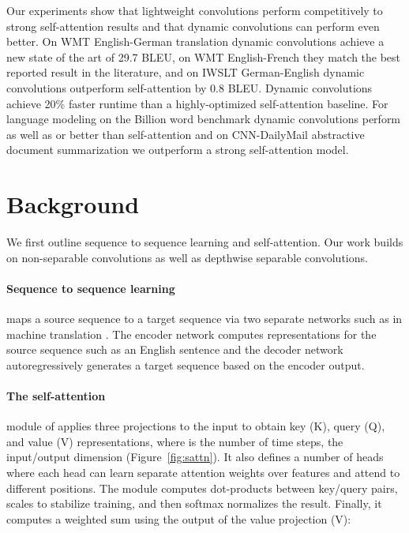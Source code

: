 \documentclass{article} \usepackage{iclr2019_conference,times}
\def\sdconvfull{lightweight convolution}
\def\Tvsdconvfull{Dynamic convolution}
\def\tvsdconvfull{dynamic convolution}
\def\gbw{Billion word}
\def\cnndm{CNN-DailyMail}
\begin{document}
Our experiments show that \sdconvfull{}s perform competitively to strong self-attention results and that \tvsdconvfull{}s can perform even better.
On WMT English-German translation \tvsdconvfull{}s achieve a new state of the art of 29.7 BLEU, on WMT English-French they match the best reported result in the literature, and on IWSLT German-English \tvsdconvfull{}s outperform self-attention by 0.8 BLEU.
\Tvsdconvfull{}s achieve 20\% faster runtime than a highly-optimized self-attention baseline.
For language modeling on the \gbw{} benchmark \tvsdconvfull{}s perform as well as or better than self-attention and on \cnndm{} abstractive document summarization we outperform a strong self-attention model.


 


\section{Background}\label{sec:background}
We first outline sequence to sequence learning and self-attention. Our work builds on non-separable convolutions as well as depthwise separable convolutions.

\paragraph{Sequence to sequence learning } maps a source sequence to a target sequence via two separate networks such as in machine translation \citep{sutskever2014sequence}.
The encoder network computes representations for the source sequence such as an English sentence and the decoder network autoregressively generates a target sequence based on the encoder output. 


\paragraph{The self-attention} module of \citet{vaswani2017transformer} applies three projections to the input  to obtain key (K), query (Q), and value (V) representations, where  is the number of time steps,  the input/output dimension (Figure~\ref{fig:sattn}). 
It also defines a number of heads  where each head can learn separate attention weights over  features and attend to different positions.
The module computes dot-products between key/query pairs, scales to stabilize training, and then softmax normalizes the result. 
Finally, it computes a weighted sum using the output of the value projection (V):
\end{document}
